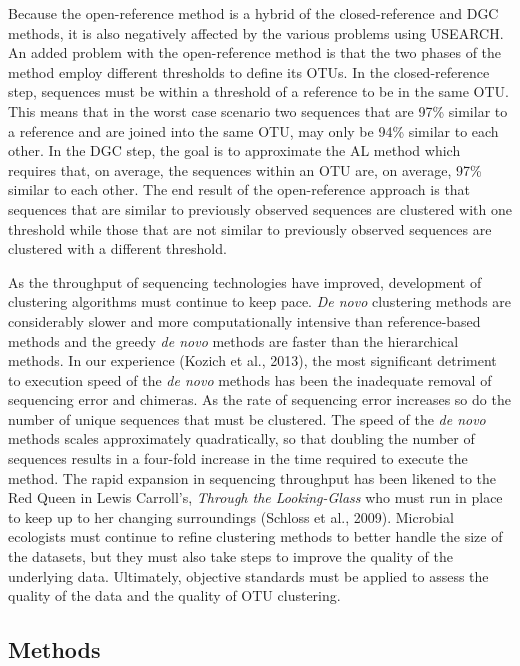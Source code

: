 \documentclass[11pt,]{article}
\begin{document}
Because the open-reference method is a hybrid of the closed-reference
and DGC methods, it is also negatively affected by the various problems
using USEARCH. An added problem with the open-reference method is that
the two phases of the method employ different thresholds to define its
OTUs. In the closed-reference step, sequences must be within a threshold
of a reference to be in the same OTU. This means that in the worst case
scenario two sequences that are 97\% similar to a reference and are
joined into the same OTU, may only be 94\% similar to each other. In the
DGC step, the goal is to approximate the AL method which requires that,
on average, the sequences within an OTU are, on average, 97\% similar to
each other. The end result of the open-reference approach is that
sequences that are similar to previously observed sequences are
clustered with one threshold while those that are not similar to
previously observed sequences are clustered with a different threshold.

As the throughput of sequencing technologies have improved, development
of clustering algorithms must continue to keep pace. \emph{De novo}
clustering methods are considerably slower and more computationally
intensive than reference-based methods and the greedy \emph{de novo}
methods are faster than the hierarchical methods. In our experience
(Kozich et al., 2013), the most significant detriment to execution speed
of the \emph{de novo} methods has been the inadequate removal of
sequencing error and chimeras. As the rate of sequencing error increases
so do the number of unique sequences that must be clustered. The speed
of the \emph{de novo} methods scales approximately quadratically, so
that doubling the number of sequences results in a four-fold increase in
the time required to execute the method. The rapid expansion in
sequencing throughput has been likened to the Red Queen in Lewis
Carroll's, \emph{Through the Looking-Glass} who must run in place to
keep up to her changing surroundings (Schloss et al., 2009). Microbial
ecologists must continue to refine clustering methods to better handle
the size of the datasets, but they must also take steps to improve the
quality of the underlying data. Ultimately, objective standards must be
applied to assess the quality of the data and the quality of OTU
clustering.

\subsection{Methods}\label{methods}
\end{document}
